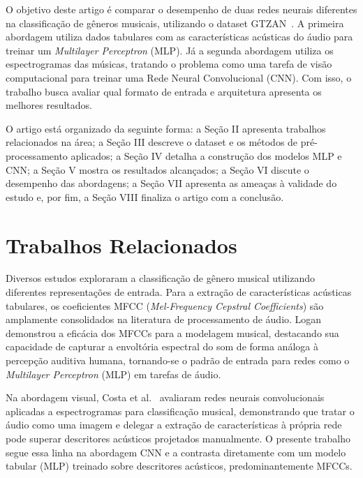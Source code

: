 \documentclass[conference]{IEEEtran}
\begin{document}
	O objetivo deste artigo é comparar o desempenho de duas redes neurais diferentes na classificação de gêneros musicais, utilizando o dataset GTZAN~\cite{tzanetakis2002}. A primeira abordagem utiliza dados tabulares com as características acústicas do áudio para treinar um \textit{Multilayer Perceptron} (MLP). Já a segunda abordagem utiliza os espectrogramas das músicas, tratando o problema como uma tarefa de visão computacional para treinar uma Rede Neural Convolucional (CNN). Com isso, o trabalho busca avaliar qual formato de entrada e arquitetura apresenta os melhores resultados.
	
	O artigo está organizado da seguinte forma: a Seção II apresenta trabalhos relacionados na área; a Seção III descreve o dataset e os métodos de pré-processamento aplicados; a Seção IV detalha a construção dos modelos MLP e CNN; a Seção V mostra os resultados alcançados; a Seção VI discute o desempenho das abordagens; a Seção VII apresenta as ameaças à validade do estudo e, por fim, a Seção VIII finaliza o artigo com a conclusão.
	
	\section{Trabalhos Relacionados}
	Diversos estudos exploraram a classificação de gênero musical utilizando diferentes representações de entrada. Para a extração de características acústicas tabulares, os coeficientes MFCC (\textit{Mel-Frequency Cepstral Coefficients}) são amplamente consolidados na literatura de processamento de áudio. Logan~\cite{logan2000} demonstrou a eficácia dos MFCCs para a modelagem musical, destacando sua capacidade de capturar a envoltória espectral do som de forma análoga à percepção auditiva humana, tornando-se o padrão de entrada para redes como o \textit{Multilayer Perceptron} (MLP) em tarefas de áudio.
	
	Na abordagem visual, Costa et al.~\cite{costa2017} avaliaram redes neurais convolucionais aplicadas a espectrogramas para classificação musical, demonstrando que tratar o áudio como uma imagem e delegar a extração de características à própria rede pode superar descritores acústicos projetados manualmente. O presente trabalho segue essa linha na abordagem CNN e a contrasta diretamente com um modelo tabular (MLP) treinado sobre descritores acústicos, predominantemente MFCCs.
	
\end{document}
